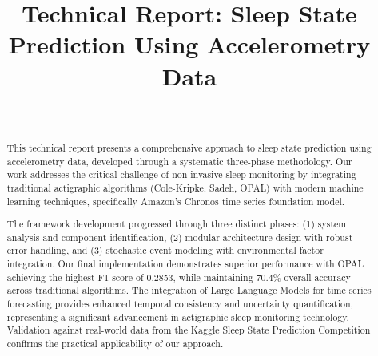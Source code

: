 \documentclass[conference]{IEEEtran}
\begin{document}
\title{Technical Report: Sleep State Prediction Using Accelerometry Data}

\author{
	\\
	\and
}

\maketitle

\begin{abstract}
This technical report presents a comprehensive approach to sleep state prediction using accelerometry data, developed through a systematic three-phase methodology. Our work addresses the critical challenge of non-invasive sleep monitoring by integrating traditional actigraphic algorithms (Cole-Kripke, Sadeh, OPAL) with modern machine learning techniques, specifically Amazon's Chronos time series foundation model. 

The framework development progressed through three distinct phases: (1) system analysis and component identification, (2) modular architecture design with robust error handling, and (3) stochastic event modeling with environmental factor integration. Our final implementation demonstrates superior performance with OPAL achieving the highest F1-score of 0.2853, while maintaining 70.4\% overall accuracy across traditional algorithms. The integration of Large Language Models for time series forecasting provides enhanced temporal consistency and uncertainty quantification, representing a significant advancement in actigraphic sleep monitoring technology. Validation against real-world data from the Kaggle Sleep State Prediction Competition confirms the practical applicability of our approach.
\end{abstract}
\end{document}
